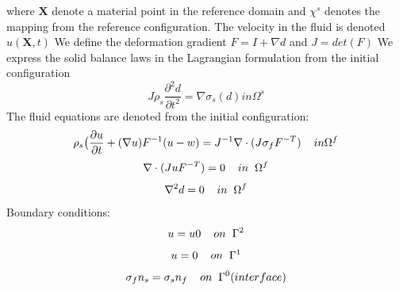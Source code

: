 where $\textbf{X}$ denote a material point in the reference domain and $\chi^s$ denotes the mapping from the reference configuration.
The velocity in the fluid is denoted $u(\textbf{X},t)$
We define the deformation gradient $F = I + \nabla d$ and $J = det(F)$
We express the solid balance laws in the Lagrangian formulation from the initial configuration
$$J\rho_s \frac{\partial^2 d}{\partial t^2} = \nabla \sigma_s(d) in \Omega^s $$
The fluid equations are denoted from the initial configuration:
$$ \rho_s \big( \frac{\partial u}{\partial t} + (\nabla u)F^{-1}(u-w) = J^{-1} \nabla \cdot (J\sigma_f F^{-T} )\hspace{4mm} in \Omega^f $$
$$ \nabla \cdot (J u F^{-T}) = 0 \hspace{4mm} in \hspace{2mm} \Omega^f$$
$$ \nabla^2 d = 0\hspace{4mm}in \hspace{2mm} \Omega^f $$
Boundary conditions:
$$ u = u0 \hspace{4mm}on \hspace{2mm} \Gamma^2$$
$$ u = 0  \hspace{4mm}on \hspace{2mm} \Gamma^1  $$
$$  \sigma_f n_s = \sigma_s n_f \hspace{4mm} on  \hspace{2mm}\Gamma^0 (interface)   $$




